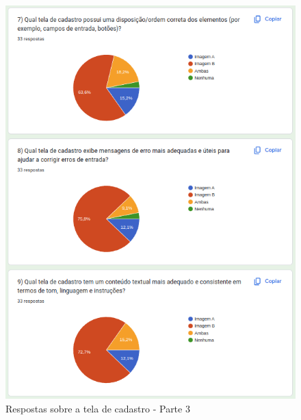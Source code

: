 \begin{figure}[!h]
	\begin{center}
	    \includegraphics[scale=0.7]{figs/Answers/Students/10.png}
	\end{center}
	\caption{\label{APB_TC03}Respostas sobre a tela de cadastro - Parte 3}
\end{figure}

\newpage

